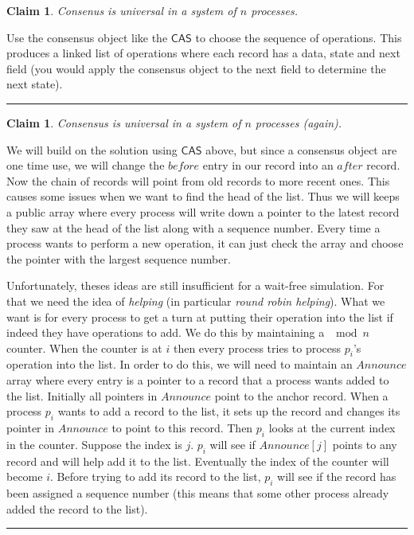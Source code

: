 \documentclass[twoside]{article}
\newtheorem{claim}[theorem]{Claim}
\newenvironment{proof}{{\bf Proof:}}{\hfill\rule{2mm}{2mm}}
\newcommand\CAS{\mathsf{CAS}}
\begin{document}
\begin{claim}
Consenus is universal in a system of $n$ processes.
\end{claim}
\begin{proof}
Use the consensus object like the $\CAS$ to choose the sequence of operations. This produces a linked list of operations where each record has a data, state and next field (you would apply the consensus object to the next field to determine the next state). 
\end{proof}

\begin{claim}
Consensus is universal in a system of $n$ processes (again). 
\end{claim}
\begin{proof}
We will build on the solution using $\CAS$ above, but since a consensus object are one time use, we will change the $before$ entry in our record into an $after$ record. Now the chain of records will point from old records to more recent ones. This causes some issues when we want to find the head of the list. Thus we will keeps a public array where every process will write down a pointer to the latest record they saw at the head of the list along with a sequence number. Every time a process wants to perform a new operation, it can just check the array and choose the pointer with the largest sequence number.

Unfortunately, theses ideas are still insufficient for a wait-free simulation. For that we need the idea of \emph{helping} (in particular \emph{round robin helping}). What we want is for every process to get a turn at putting their operation into the list if indeed they have operations to add. We do this by maintaining a $\mod n$ counter. When the counter is at $i$ then every process tries to process $p_i$'s operation into the list. In order to do this, we will need to maintain an $Announce$ array where every entry is a pointer to a record that a process wants added to the list. Initially all pointers in $Announce$ point to the anchor record. When a process $p_i$ wants to add a record to the list, it sets up the record and changes its pointer in $Announce$ to point to this record. Then $p_i$ looks at the current index in the counter. Suppose the index is $j$. $p_i$ will see if $Announce[j]$ points to any record and will help add it to the list. Eventually the index of the counter will become $i$. Before trying to add its record to the list, $p_i$ will see if the record has been assigned a sequence number (this means that some other process already added the record to the list).   
\end{proof}
\end{document}
